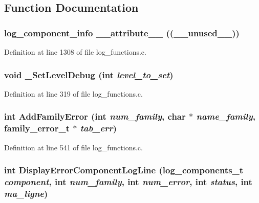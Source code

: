 \subsection{Function Documentation}
\subsubsection[{\_\-\_\-attribute\_\-\_\-}]{\setlength{\rightskip}{0pt plus 5cm}log\_\-component\_\-info \_\-\_\-attribute\_\-\_\- ((\_\-\_\-unused\_\-\_\-))}\label{log__functions_8c_a724e571bcbf4c0d233bacf79a6642b90}


Definition at line 1308 of file log\_\-functions.c.
\subsubsection[{\_\-SetLevelDebug}]{\setlength{\rightskip}{0pt plus 5cm}void \_\-SetLevelDebug (int {\em level\_\-to\_\-set})}\label{log__functions_8c_ac9432413a63c6f800a0f1c0b3b8288ea}


Definition at line 319 of file log\_\-functions.c.
\subsubsection[{AddFamilyError}]{\setlength{\rightskip}{0pt plus 5cm}int AddFamilyError (int {\em num\_\-family}, \/  char $\ast$ {\em name\_\-family}, \/  family\_\-error\_\-t $\ast$ {\em tab\_\-err})}\label{log__functions_8c_a941a9e17b9296690cb5ea89ac8bf5a47}


Definition at line 541 of file log\_\-functions.c.
\subsubsection[{DisplayErrorComponentLogLine}]{\setlength{\rightskip}{0pt plus 5cm}int DisplayErrorComponentLogLine (log\_\-components\_\-t {\em component}, \/  int {\em num\_\-family}, \/  int {\em num\_\-error}, \/  int {\em status}, \/  int {\em ma\_\-ligne})}\label{log__functions_8c_a950ce4a839020598c6f8ce00a7bbe434}



